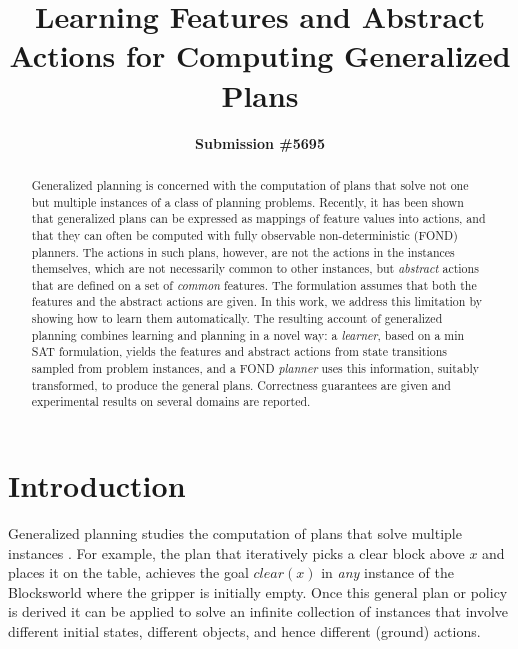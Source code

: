 \documentclass[letterpaper]{article} %
\title{Learning Features and Abstract Actions for Computing Generalized Plans}
\author{\textbf{Submission \#5695}}
\begin{document}
\maketitle

\begin{abstract}
  Generalized planning is concerned with the computation of plans that solve not one but multiple instances
  of a class of planning problems.
  Recently, it has been shown that generalized plans can be expressed as mappings of feature
  values into actions, and that they can often be computed with fully observable non-deterministic
  (FOND) planners. %
  The actions in such plans, however, are not the actions in the instances themselves, which are
  not necessarily common to  other instances, but \emph{abstract} actions that are defined on a set 
  of \emph{common} features. The formulation assumes that both the features and the abstract
  actions are given.
  In this work, we address this limitation by showing how to learn them automatically. 
  The resulting account of generalized planning combines learning and planning
  in a novel way: a \emph{learner}, based on a min SAT formulation, yields the features and abstract
  actions from state transitions sampled from problem instances, and a FOND \emph{planner}
  uses this information, suitably transformed, to produce the general plans.
  Correctness guarantees are given and experimental results on several domains are reported.
\end{abstract}


\section{Introduction}

Generalized planning studies the computation of plans  that   solve   multiple  instances
\cite{srivastava08learning,bonet09automatic,srivastava:generalized,hu:generalized,BelleL16,anders:generalized}.
For example, the plan  that iteratively  picks  a  clear block above $x$ 
and places it  on the table, achieves the goal $clear(x)$
in \emph{any} instance of the Blocksworld where the gripper is initially empty.
Once this  general plan or  policy is derived it can be  applied to solve an infinite collection
of instances that involve different initial states, different objects, and hence  different (ground)  actions. 
\end{document}
